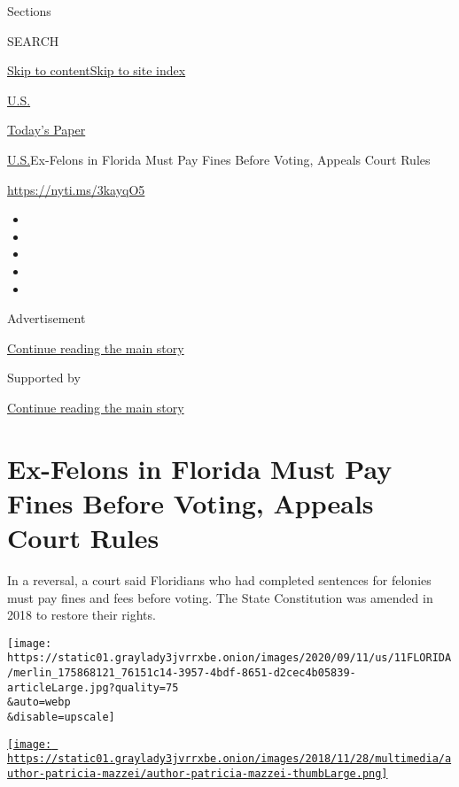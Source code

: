 Sections

SEARCH

\protect\hyperlink{site-content}{Skip to
content}\protect\hyperlink{site-index}{Skip to site index}

\href{https://www.nytimes3xbfgragh.onion/section/us}{U.S.}

\href{https://myaccount.nytimes3xbfgragh.onion/auth/login?response_type=cookie\&client_id=vi}{}

\href{https://www.nytimes3xbfgragh.onion/section/todayspaper}{Today's
Paper}

\href{/section/us}{U.S.}\textbar{}Ex-Felons in Florida Must Pay Fines
Before Voting, Appeals Court Rules

\url{https://nyti.ms/3kayqO5}

\begin{itemize}
\item
\item
\item
\item
\item
\end{itemize}

Advertisement

\protect\hyperlink{after-top}{Continue reading the main story}

Supported by

\protect\hyperlink{after-sponsor}{Continue reading the main story}

\hypertarget{ex-felons-in-florida-must-pay-fines-before-voting-appeals-court-rules}{%
\section{Ex-Felons in Florida Must Pay Fines Before Voting, Appeals
Court
Rules}\label{ex-felons-in-florida-must-pay-fines-before-voting-appeals-court-rules}}

In a reversal, a court said Floridians who had completed sentences for
felonies must pay fines and fees before voting. The State Constitution
was amended in 2018 to restore their rights.

\texttt{[image: https://static01.graylady3jvrrxbe.onion/images/2020/09/11/us/11FLORIDA/merlin\_175868121\_76151c14-3957-4bdf-8651-d2cec4b05839-articleLarge.jpg?quality=75\\\&auto=webp\\\&disable=upscale]}

\href{https://www.nytimes3xbfgragh.onion/by/patricia-mazzei}{\texttt{[image: https://static01.graylady3jvrrxbe.onion/images/2018/11/28/multimedia/author-patricia-mazzei/author-patricia-mazzei-thumbLarge.png]}}

